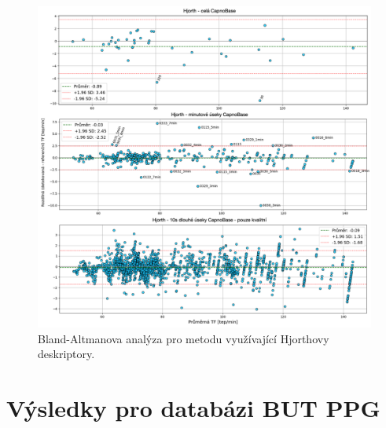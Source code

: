 \begin{figure}[!ht]
	\centering
	\includegraphics[width=1\textwidth]{./obrazky/vysledky/BlandAltman_CB_Hjorth.png}
	\caption[Bland-Altmanova analýza pro metodu využívající Hjorthovy deskriptory]{Bland-Altmanova analýza pro metodu využívající Hjorthovy deskriptory.}
	\label{fig:capnobase_BlandAltman_hjorth}
\end{figure}

\FloatBarrier
\section{Výsledky pro databázi BUT PPG}
\label{sec:vysledky_butppg}

